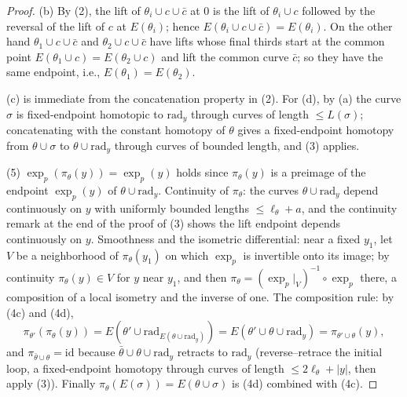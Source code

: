 \begin{proof}
(b) By (2), the lift of $\theta_i\cup c\cup\bar c$ at $0$ is the
lift of $\theta_i\cup c$ followed by the reversal of the lift of
$c$ at $E(\theta_i)$; hence
$E(\theta_i\cup c\cup\bar c)=E(\theta_i)$. On the other hand
$\theta_1\cup c\cup\bar c$ and $\theta_2\cup c\cup\bar c$ have
lifts whose final thirds start at the common point
$E(\theta_1\cup c)=E(\theta_2\cup c)$ and lift the common curve
$\bar c$; so they have the same endpoint, i.e.,
$E(\theta_1)=E(\theta_2)$.

(c) is immediate from the concatenation property in (2). For (d),
by (a) the curve $\sigma$ is fixed-endpoint homotopic to
$\mathrm{rad}_y$ through curves of length $\le L(\sigma)$;
concatenating with the constant homotopy of $\theta$ gives a
fixed-endpoint homotopy from $\theta\cup\sigma$ to
$\theta\cup\mathrm{rad}_y$ through curves of bounded length, and
(3) applies.

(5) $\exp_p(\pi_\theta(y))=\exp_p(y)$ holds since
$\pi_\theta(y)$ is a preimage of the endpoint
$\exp_p(y)$ of $\theta\cup\mathrm{rad}_y$. Continuity of
$\pi_\theta$: the curves $\theta\cup\mathrm{rad}_y$ depend
continuously on $y$ with uniformly bounded lengths
$\le\ell_\theta+a$, and the continuity remark at the end of the
proof of (3) shows the lift endpoint depends continuously on
$y$. Smoothness and the
isometric differential: near a fixed $y_1$, let $V$ be a
neighborhood of $\pi_\theta(y_1)$ on which $\exp_p$ is
invertible onto its image; by continuity
$\pi_\theta(y)\in V$ for $y$ near $y_1$, and then
$\pi_\theta=(\exp_p|_V)^{-1}\circ\exp_p$ there, a
composition of a local isometry and the inverse of one. The
composition rule: by (4c) and (4d),
$$\pi_{\theta'}(\pi_\theta(y))
=E\left(\theta'\cup\mathrm{rad}_{E(\theta\cup\mathrm{rad}_y)}\right)
=E\left(\theta'\cup\theta\cup\mathrm{rad}_y\right)
=\pi_{\theta'\cup\theta}(y),$$
and $\pi_{\bar\theta\cup\theta}=\mathrm{id}$ because
$\bar\theta\cup\theta\cup\mathrm{rad}_y$ retracts to
$\mathrm{rad}_y$ (reverse--retrace the initial loop, a
fixed-endpoint homotopy through curves of length $\le
2\ell_\theta+|y|$, then apply (3)). Finally
$\pi_\theta(E(\sigma))=E(\theta\cup\sigma)$ is (4d) combined with
(4c).
\end{proof}

